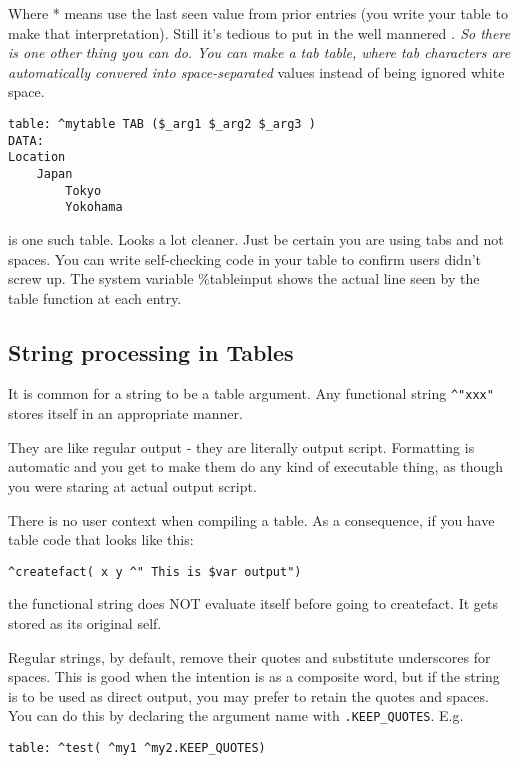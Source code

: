 \documentclass[]{article}
\begin{document}
Where * means use the last seen value from prior entries (you write your
table to make that interpretation). Still it's tedious to put in the
well mannered \emph{. So there is one other thing you can do. You can
make a tab table, where tab characters are automatically convered into
space-separated } values instead of being ignored white space.

\begin{verbatim}
table: ^mytable TAB ($_arg1 $_arg2 $_arg3 )
DATA:
Location
    Japan   
        Tokyo   
        Yokohama
\end{verbatim}

is one such table. Looks a lot cleaner. Just be certain you are using
tabs and not spaces. You can write self-checking code in your table to
confirm users didn't screw up. The system variable \%tableinput shows
the actual line seen by the table function at each entry.

\subsection{String processing in
Tables}\label{string-processing-in-tables}

It is common for a string to be a table argument. Any functional string
\texttt{\^{}"xxx"} stores itself in an appropriate manner.

They are like regular output - they are literally output script.
Formatting is automatic and you get to make them do any kind of
executable thing, as though you were staring at actual output script.

There is no user context when compiling a table. As a consequence, if
you have table code that looks like this:

\begin{verbatim}
^createfact( x y ^" This is $var output")
\end{verbatim}

the functional string does NOT evaluate itself before going to
createfact. It gets stored as its original self.

Regular strings, by default, remove their quotes and substitute
underscores for spaces. This is good when the intention is as a
composite word, but if the string is to be used as direct output, you
may prefer to retain the quotes and spaces. You can do this by declaring
the argument name with \texttt{.KEEP\_QUOTES}. E.g.

\begin{verbatim}
table: ^test( ^my1 ^my2.KEEP_QUOTES)
\end{verbatim}
\end{document}
